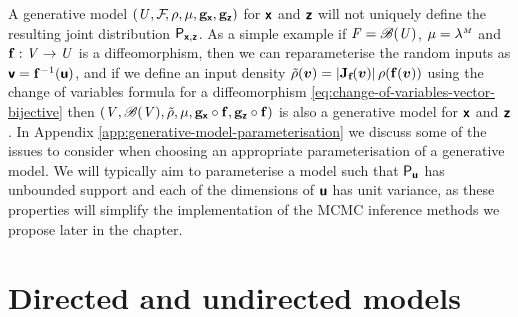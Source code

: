 A generative model $(\mathit{U},\mathcal{F}\kern-2pt,\rho,\mu,{\mathbf{g}}_{\boldsymbol{\mathsf{x}}},{\mathbf{g}}_{\boldsymbol{\mathsf{z}}})$ for $\boldsymbol{\mathsf{x}}$ and $\boldsymbol{\mathsf{z}}$ will not uniquely define the resulting joint distribution $\mathsf{P}_{\boldsymbol{\mathsf{x}},\boldsymbol{\mathsf{z}}}$. As a simple example if $\mathit{F} = \mathscr{B}(\mathit{U})$, $\mu=\lebm{M}$ and ${\mathbf{f}} : \mathit{V} \to \mathit{U}$ is a diffeomorphism, then we can reparameterise the random inputs as $\boldsymbol{\mathsf{v}} = {\mathbf{f}}^{-1}(\boldsymbol{\mathsf{u}})$, and if we define an input density $\tilde{\rho}(\vct{v}) = \left|\jacob{\vctfunc{f}}{\vct{v}}\right|\, \rho\lpa \vctfunc{f}(\vct{v})\rpa$  using the change of variables formula for a diffeomorphism \eqref{eq:change-of-variables-vector-bijective} then $(\mathit{V},\mathscr{B}(\mathit{V}),\tilde{\rho},\mu,{\mathbf{g}}_{\boldsymbol{\mathsf{x}}}\circ{\mathbf{f}},{\mathbf{g}}_{\boldsymbol{\mathsf{z}}}\circ{\mathbf{f}})$ is also a generative model for $\boldsymbol{\mathsf{x}}$ and $\boldsymbol{\mathsf{z}}$. In Appendix \ref{app:generative-model-parameterisation} we discuss some of the issues to consider when choosing an appropriate parameterisation of a generative model. We will typically aim to parameterise a model such that $\mathsf{P}_{\boldsymbol{\mathsf{u}}}$ has unbounded support and each of the dimensions of $\boldsymbol{\mathsf{u}}$ has unit variance, as these properties will simplify the implementation of the \ac{MCMC} inference methods we propose later in the chapter.

\section{Directed and undirected models}

